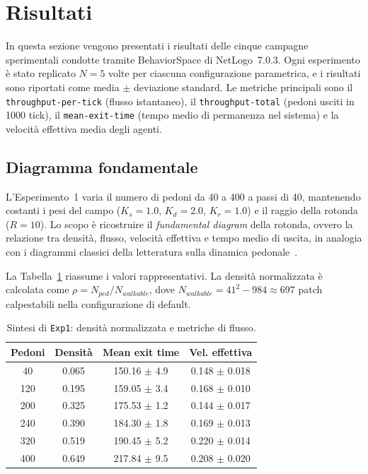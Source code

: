 \section{Risultati}
In questa sezione vengono presentati i risultati delle cinque campagne sperimentali condotte tramite BehaviorSpace di NetLogo~7.0.3. Ogni esperimento è stato replicato $N=5$ volte per ciascuna configurazione parametrica, e i risultati sono riportati come media $\pm$ deviazione standard. Le metriche principali sono il \texttt{throughput-per-tick} (flusso istantaneo), il \texttt{throughput-total} (pedoni usciti in 1000 tick), il \texttt{mean-exit-time} (tempo medio di permanenza nel sistema) e la velocità effettiva media degli agenti.

\subsection{Diagramma fondamentale}
L'Esperimento~1 varia il numero di pedoni da 40 a 400 a passi di 40, mantenendo costanti i pesi del campo ($K_s = 1.0$, $K_d = 2.0$, $K_r = 1.0$) e il raggio della rotonda ($R = 10$). Lo scopo è ricostruire il \textit{fundamental diagram} della rotonda, ovvero la relazione tra densità, flusso, velocità effettiva e tempo medio di uscita, in analogia con i diagrammi classici della letteratura sulla dinamica pedonale~\cite{zhang2012}.

La Tabella~\ref{tab:exp1} riassume i valori rappresentativi. La densità normalizzata è calcolata come $\rho = N_{ped} / N_{walkable}$, dove $N_{walkable} = 41^2 - 984 \approx 697$ patch calpestabili nella configurazione di default.

\begin{table}[H]
\centering
\caption{Sintesi di \texttt{Exp1}: densità normalizzata e metriche di flusso.}
\label{tab:exp1}
\begin{tabular}{cccc}
\toprule
Pedoni & Densità & Mean exit time & Vel. effettiva \\
\midrule
40  & 0.065 & 150.16 $\pm$ 4.9 & 0.148 $\pm$ 0.018 \\
120 & 0.195 & 159.05 $\pm$ 3.4 & 0.168 $\pm$ 0.010 \\
200 & 0.325 & 175.53 $\pm$ 1.2 & 0.144 $\pm$ 0.017 \\
240 & 0.390 & 184.30 $\pm$ 1.8 & 0.169 $\pm$ 0.013 \\
320 & 0.519 & 190.45 $\pm$ 5.2 & 0.220 $\pm$ 0.014 \\
400 & 0.649 & 217.84 $\pm$ 9.5 & 0.208 $\pm$ 0.020 \\
\bottomrule
\end{tabular}
\end{table}

